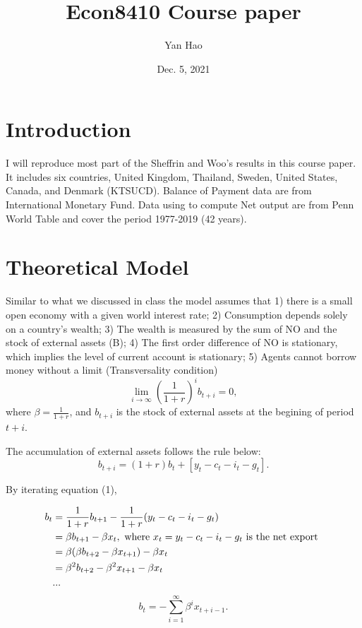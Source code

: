 \documentclass[12pt]{article}
\title{Econ8410 Course paper}
\author{Yan Hao}
\date{Dec. 5, 2021}
\begin{document}
\maketitle




\section{Introduction}
I will reproduce most part of the Sheffrin and Woo's results in this course paper. It
includes six countries, United Kingdom, Thailand, Sweden, United States, Canada, and
Denmark (KTSUCD). Balance of Payment data are from International Monetary Fund. Data 
using to compute Net output are from Penn World Table and cover the period 1977-2019 
(42 years).


\section{Theoretical Model}
Similar to what we discussed in class the model assumes that 1) there is a small open 
economy with a given world interest rate; 2) Consumption depends solely on a country's
wealth; 3) The wealth is measured by the sum of NO and the stock of external assets (B);
4) The first order difference of NO is stationary, which implies the level of current
account is stationary; 5) Agents cannot borrow money without a limit (Transversality 
condition)
\begin{equation*}
\lim_{i \to \infty} \left( \frac{1}{1 + r} \right) ^{i}	b_{t + i} = 0, 
\end{equation*}
where $ \beta = \frac{1}{1 + r} $, and $ b_{t + i} $ is the stock of external assets
at the begining of period $ t + i $.


The accumulation of external assets follows the rule below:
\begin{equation}
b_{t + i} = (1 + r)b_{t} + \left[ y_{t} - c_{t} - i_{t} - g_{t} \right].
\end{equation}

By iterating equation (1),

\begin{align*}
b_{t} &= \frac{1}{1 + r}b_{t + 1} - \frac{1}{1 + r}(y_{t} - c_{t} - i_{t} - g_{t})\\
 &= \beta b_{t + 1} -  \beta x_{t}, \text{ where $ x_{t} = y_{t} - c_{t} - i_{t} - 
 g_{t}$ is the net export }\\
 &= \beta(\beta b_{t + 2} - \beta x_{t + 1}) - \beta x_{t}\\
 &= \beta^{2} b_{t + 2} - \beta^{2} x_{t + 1}  - \beta x_{t}\\
 &...\\
\end{align*}
\begin{equation}
b_{t} =  - \sum\limits_{i = 1} ^\infty \beta^{i} x_{t + i - 1}	.
\end{equation}
\end{document}
